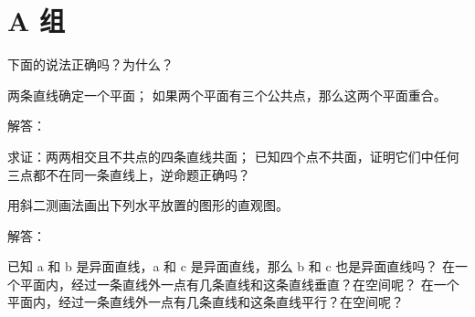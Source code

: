 \section*{A 组}
\begin{question}
  \item 下面的说法正确吗？为什么？
  \begin{tasks}
    \task 两条直线确定一个平面；
    \task 如果两个平面有三个公共点，那么这两个平面重合。
  \end{tasks}
  \item 解答：
  \begin{tasks}
    \task 求证：两两相交且不共点的四条直线共面；
    \task 已知四个点不共面，证明它们中任何三点都不在同一条直线上，逆命题正确吗？
  \end{tasks}
  \item 用斜二测画法画出下列水平放置的图形的直观图。
  \item 解答：
  \begin{tasks}
    \task 已知 a 和 b 是异面直线，a 和 c 是异面直线，那么 b 和 c 也是异面直线吗？
    \task 在一个平面内，经过一条直线外一点有几条直线和这条直线垂直？在空间呢？
    \task 在一个平面内，经过一条直线外一点有几条直线和这条直线平行？在空间呢？
  \end{tasks}
  \item 
  \item 
  \item 
  \item 
  \item 
  \item 
  \item 
  \item 
  \item 
  \item 
\end{question}
